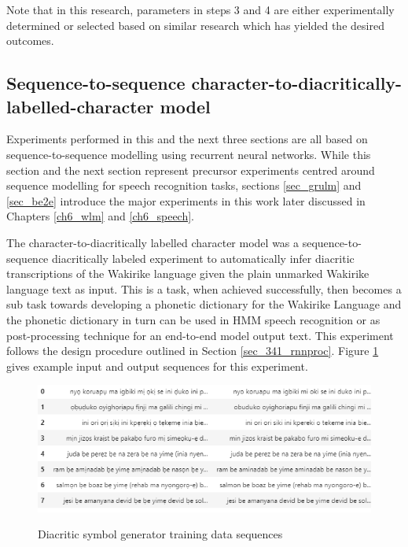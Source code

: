 Note that in this research, parameters in steps 3 and 4 are either experimentally determined or selected based on similar research which has yielded the desired outcomes.



\subsection{Sequence-to-sequence character-to-diacritically-labelled-character model}\label{sec_c2d}
Experiments performed in this and the next three sections are all based on sequence-to-sequence modelling using recurrent neural networks.  While this section and the next section represent precursor experiments centred around sequence modelling for speech recognition tasks, sections \ref{sec_grulm} and \ref{sec_be2e} introduce the major experiments in this work later discussed in Chapters \ref{ch6_wlm} and \ref{ch6_speech}.


The character-to-diacritically labelled character model was a sequence-to-sequence diacritically labeled experiment to automatically infer diacritic transcriptions of the Wakirike language given the plain unmarked Wakirike language text as input.  This is a task, when achieved successfully, then becomes a sub task towards developing a phonetic dictionary for the Wakirike Language and the phonetic dictionary in turn can be used in HMM speech recognition or as post-processing technique for an end-to-end model output text.  This experiment follows the design procedure outlined in Section \ref{sec_341_rnnproc}. Figure \ref{fig_c3_t2d_sample} gives example input and output sequences for this experiment.

\begin{figure}
\centering
  \includegraphics[width=14cm]{thesis/images/diacritic.png}\\
  \caption{Diacritic symbol generator training data sequences}\label{fig_c3_t2d_sample}
\end{figure}

